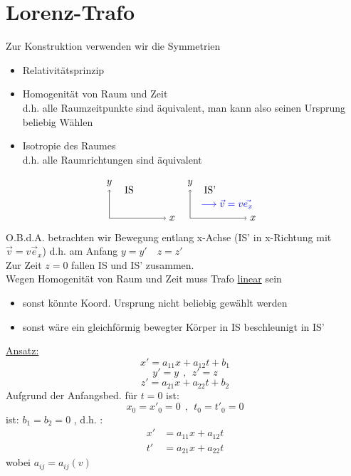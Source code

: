 \documentclass[titlepage,12pt,a4paper,ngerman]{report}
\begin{document}
{\section{Lorenz-Trafo}
Zur Konstruktion verwenden wir die Symmetrien
\begin{itemize}
	\item Relativitätsprinzip
	\item Homogenität von Raum und Zeit\\
	d.h. alle Raumzeitpunkte sind äquivalent, man kann also seinen Ursprung beliebig Wählen
	\item Isotropie des Raumes\\
	d.h. alle Raumrichtungen sind äquivalent
\end{itemize}
$$
\begin{tikzpicture}
\draw[->] (0,0) -- (2,0) node[right] {$x$}; 
\draw[->] (0,0) -- (0,1) node[above] {$y$};
\node at (0.7,1) [align=flush center,text width=2cm]
{IS};
\end{tikzpicture}%
\begin{tikzpicture}
\draw[->] (0,0) -- (2,0) node[right] {$x$}; 
\draw[->] (0,0) -- (0,1) node[above] {$y$};
\node at (1.3,0.5) [align=flush center,text width=3cm]
{\color{blue}$\longrightarrow \vec{v} = v\vec{e_x}$};
\node at (0.7,1) [align=flush center,text width=2cm]
{IS'};
\end{tikzpicture}
$$
O.B.d.A. betrachten wir Bewegung entlang x-Achse (IS' in x-Richtung mit $ \vec{v} = v \vec{e}_x $) d.h. am Anfang $ y = y' \quad z = z' $\\
Zur Zeit $ z=0 $ fallen IS und IS' zusammen.\\[5pt]
Wegen Homogenität von Raum und Zeit muss Trafo \underline{linear} sein
\begin{itemize}
	\item sonst könnte Koord. Ursprung nicht beliebig gewählt werden
	\item sonst wäre ein gleichförmig bewegter Körper in IS beschleunigt in IS' 
\end{itemize}
\underline{Ansatz:} 
$$x' = a_{11} x + a_{12} t + b_1$$
$$y' = y \ \ , \ \ z' = z$$
$$z' = a_{21} x + a_{22} t + b_2$$
Aufgrund der Anfangsbed. für $ t=0 $ ist:
$$x_0 = x'_0 = 0 \ \ , \ \ t_0 = t'_0 = 0$$
ist: $b_1 = b_2 = 0$ , d.h. :
\begin{align}
x' &= a_{11} x + a_{12} t \tag{1}\\
t' &= a_{21} x + a_{22} t \tag{2}
\end{align}
wobei $ a_{ij} = a_{ij}(v) $\\[5pt]
}
\end{document}
